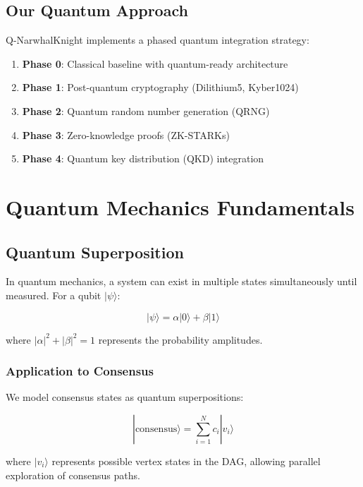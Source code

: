 \documentclass[11pt,a4paper]{article}
\begin{document}
\subsection{Our Quantum Approach}

Q-NarwhalKnight implements a phased quantum integration strategy:

\begin{enumerate}
    \item \textbf{Phase 0}: Classical baseline with quantum-ready architecture
    \item \textbf{Phase 1}: Post-quantum cryptography (Dilithium5, Kyber1024)
    \item \textbf{Phase 2}: Quantum random number generation (QRNG)
    \item \textbf{Phase 3}: Zero-knowledge proofs (ZK-STARKs)
    \item \textbf{Phase 4}: Quantum key distribution (QKD) integration
\end{enumerate}

\section{Quantum Mechanics Fundamentals}

\subsection{Quantum Superposition}

In quantum mechanics, a system can exist in multiple states simultaneously until measured. For a qubit $|\psi\rangle$:

\begin{equation}
|\psi\rangle = \alpha|0\rangle + \beta|1\rangle
\end{equation}

where $|\alpha|^2 + |\beta|^2 = 1$ represents the probability amplitudes.

\subsubsection{Application to Consensus}

We model consensus states as quantum superpositions:

\begin{equation}
|\text{consensus}\rangle = \sum_{i=1}^{N} c_i |v_i\rangle
\end{equation}

where $|v_i\rangle$ represents possible vertex states in the DAG, allowing parallel exploration of consensus paths.
\end{document}
